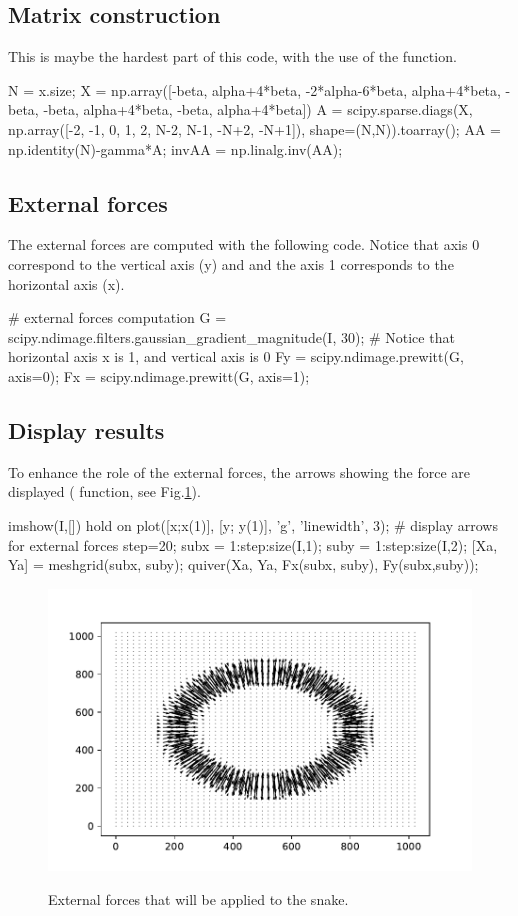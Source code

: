 \vspace*{-10pt}

\subsection{Matrix construction}
This is maybe the hardest part of this code, with the use of the  function.
\begin{python}
N = x.size;
X = np.array([-beta, alpha+4*beta, -2*alpha-6*beta, alpha+4*beta, -beta, -beta, alpha+4*beta, -beta, alpha+4*beta])
A = scipy.sparse.diags(X, np.array([-2, -1, 0, 1, 2, N-2, N-1, -N+2, -N+1]), shape=(N,N)).toarray();
AA = np.identity(N)-gamma*A;
invAA = np.linalg.inv(AA);
\end{python}

\subsection{External forces}
The external forces are computed with the following code. Notice that axis 0 correspond to the vertical axis (y) and and the axis 1 corresponds to the horizontal axis (x).
\begin{python}
# external forces computation
G = scipy.ndimage.filters.gaussian_gradient_magnitude(I, 30);
# Notice that horizontal axis x is 1, and vertical axis is 0
Fy = scipy.ndimage.prewitt(G, axis=0);
Fx = scipy.ndimage.prewitt(G, axis=1);
\end{python}

\subsection{Display results}
To enhance the role of the external forces, the arrows showing the force are displayed ( function, see Fig.\ref{fig:active_contours:python:forces}).

\begin{python}
imshow(I,[])
hold on
plot([x;x(1)], [y; y(1)], 'g', 'linewidth', 3);
# display arrows for external forces
step=20;
subx = 1:step:size(I,1);
suby = 1:step:size(I,2);
[Xa, Ya] = meshgrid(subx, suby);
quiver(Xa, Ya, Fx(subx, suby), Fy(subx,suby));
\end{python}

\begin{figure}[H]
 \centering\caption{External forces that will be applied to the snake.}%
 \includegraphics[width=.6\linewidth]{forces.python.pdf}%
 \label{fig:active_contours:python:forces}
\end{figure}

